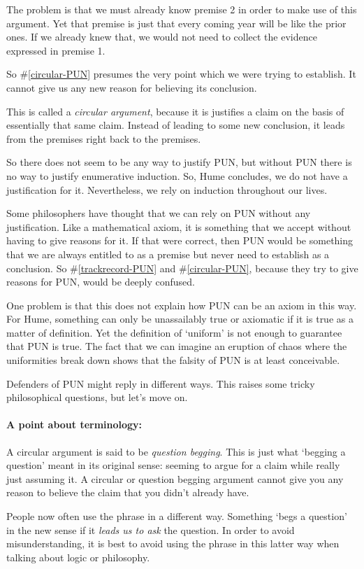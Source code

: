 \documentclass[]{article}
\newcommand*{\terminology}{\paragraph{A point about terminology:}}
\begin{document}
The problem is that we must already know premise 2 in order to make use of this argument. Yet that premise is just that every coming year will be like the prior ones. If we already knew that, we would not need to collect the evidence expressed in premise 1.

So \#\ref{circular-PUN} presumes the very point which we were trying to establish. It cannot give us any new reason for believing its conclusion.

This is called a \emph{circular argument}, because it is justifies a claim on the basis of essentially that same claim. Instead of leading to some new conclusion, it leads from the premises right back to the premises.

So there does not seem to be any way to justify PUN, but without PUN there is no way to justify enumerative induction. So, Hume concludes, we do not have a justification for it. Nevertheless, we rely on induction throughout our lives.

Some philosophers have thought that we can rely on PUN without any justification. Like a mathematical axiom, it is something that we accept without having to give reasons for it. If that were correct, then PUN would be something that we are always entitled to as a premise but never need to establish as a conclusion. So \#\ref{trackrecord-PUN} and \#\ref{circular-PUN}, because they try to give reasons for PUN, would be deeply confused.

One problem is that this does not explain how PUN can be an axiom in this way. For Hume, something can only be unassailably true or axiomatic if it is true as a matter of definition. Yet the definition of `uniform' is not enough to guarantee that PUN is true. The fact that we can imagine an eruption of chaos where the uniformities break down shows that the falsity of PUN is at least conceivable.

Defenders of PUN might reply in different ways. This raises some tricky philosophical questions, but let's move on.

\terminology A circular argument is said to be \emph{question begging}. This is just what `begging a question' meant in its original sense: seeming to argue for a claim while really just assuming it. A circular or question begging argument cannot give you any reason to believe the claim that you didn't already have.

People now often use the phrase in a different way. Something `begs a question' in the new sense if it \emph{leads us to ask} the question. In order to avoid misunderstanding, it is best to avoid using the phrase in this latter way when talking about logic or philosophy.
\end{document}

